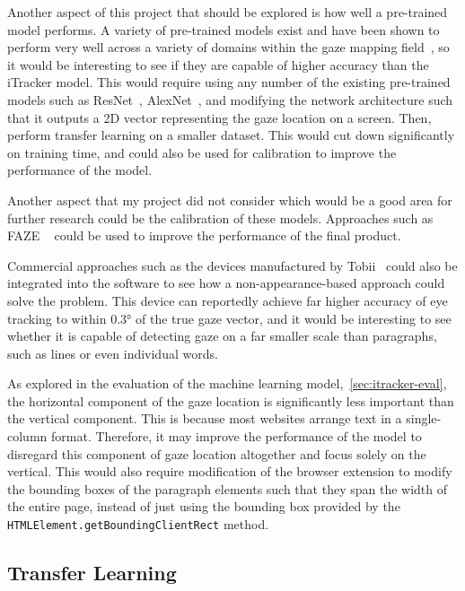 \documentclass{report}
\begin{document}
Another aspect of this project that should be explored is how well a pre-trained model performs. A variety of pre-trained models exist and have been shown to perform very well across a variety of domains within the gaze mapping field~\cite{akinyelu2020convolutional}, so it would be interesting to see if they are capable of higher accuracy than the iTracker model. This would require using any number of the existing pre-trained models such as ResNet~\cite{he2015deep}, AlexNet~\cite{krizhevsky2017imagenet}, and modifying the network architecture such that it outputs a 2D vector representing the gaze location on a screen. Then, perform transfer learning on a smaller dataset. This would cut down significantly on training time, and could also be used for calibration to improve the performance of the model. 

Another aspect that my project did not consider which would be a good area for further research could be the calibration of these models. Approaches such as FAZE ~\cite{seonwook2019fewshot} could be used to improve the performance of the final product. 

Commercial approaches such as the devices manufactured by Tobii~\cite{tobiiprofusion} could also be integrated into the software to see how a non-appearance-based approach could solve the problem. This device can reportedly achieve far higher accuracy of eye tracking to within \(\ang{0.3}\) of the true gaze vector, and it would be interesting to see whether it is capable of detecting gaze on a far smaller scale than paragraphs, such as lines or even individual words. 

As explored in the evaluation of the machine learning model,~\autoref{sec:itracker-eval}, the horizontal component of the gaze location is significantly less important than the vertical component. This is because most websites arrange text in a single-column format. Therefore, it may improve the performance of the model to disregard this component of gaze location altogether and focus solely on the vertical. This would also require modification of the browser extension to modify the bounding boxes of the paragraph elements such that they span the width of the entire page, instead of just using the bounding box provided by the \texttt{HTMLElement.getBoundingClientRect} method.


\subsection{Transfer Learning}
\end{document}
